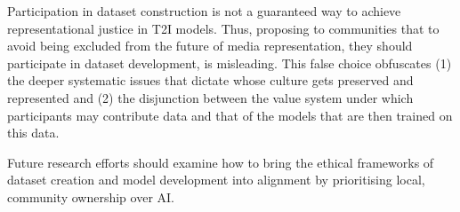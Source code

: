 Participation in dataset construction is not a guaranteed way to achieve representational justice in T2I models. Thus, proposing to communities that to avoid being excluded from the future of media representation, they should participate in dataset development, is misleading. This false choice obfuscates (1) the deeper systematic issues that dictate whose culture gets preserved and represented and (2) the disjunction between the value system under which participants may contribute data and that of the models that are then trained on this data. 

Future research efforts should examine how to bring the ethical frameworks of dataset creation and model development into alignment by prioritising local, community ownership over AI. 

